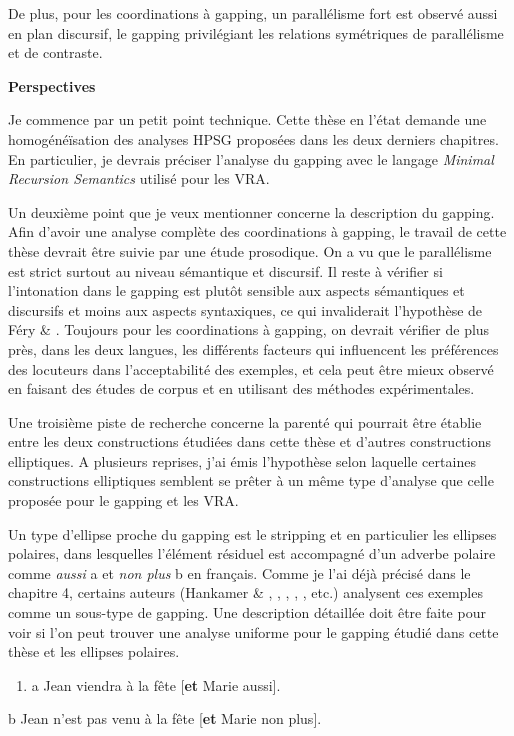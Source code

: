 De plus, pour les coordinations à gapping, un parallélisme fort est observé aussi en plan discursif, le gapping privilégiant les relations symétriques de parallélisme et de contraste.

{\bfseries
Perspectives}

Je commence par un petit point technique. Cette thèse en l'état demande une homogénéïsation des analyses HPSG proposées dans les deux derniers chapitres. En particulier, je devrais préciser l'analyse du gapping avec le langage \textit{Minimal Recursion Semantics} utilisé pour les VRA.

Un deuxième point que je veux mentionner concerne la description du gapping. Afin d'avoir une analyse complète des coordinations à gapping, le travail de cette thèse devrait être suivie par une étude prosodique. On a vu que le parallélisme est strict surtout au niveau sémantique et discursif. Il reste à vérifier si l'intonation dans le gapping est plutôt sensible aux aspects sémantiques et discursifs et moins aux aspects syntaxiques, ce qui invaliderait l'hypothèse de Féry \& \citet{Hartmann2005}. Toujours pour les coordinations à gapping, on devrait vérifier de plus près, dans les deux langues, les différents facteurs qui influencent les préférences des locuteurs dans l'acceptabilité des exemples, et cela peut être mieux observé en faisant des études de corpus et en utilisant des méthodes expérimentales.

Une troisième piste de recherche concerne la parenté qui pourrait être établie entre les deux constructions étudiées dans cette thèse et d'autres constructions elliptiques. A plusieurs reprises, j'ai émis l'hypothèse selon laquelle certaines constructions elliptiques semblent se prêter à un même type d'analyse que celle proposée pour le gapping et les VRA. 

Un type d'ellipse proche du gapping est le stripping et en particulier les ellipses polaires, dans lesquelles l'élément résiduel est accompagné d'un adverbe polaire comme \textit{aussi} a et \textit{non plus} b en français. Comme je l'ai déjà précisé dans le chapitre 4, certains auteurs (Hankamer \& \citet{Sag1976}, \citet{Gardent1991}, \citet{Lobeck1995}, \citet{Hartmann2000}, \citet{Toosarvandani2011}, etc.) analysent ces exemples comme un sous-type de gapping. Une description détaillée doit être faite pour voir si l'on peut trouver une analyse uniforme pour le gapping étudié dans cette thèse et les ellipses polaires.


\begin{enumerate}
\item \label{bkm:Ref307424453}a  Jean viendra à la fête [\textbf{et} Marie aussi]. 


\end{enumerate}
  b  Jean n'est pas venu à la fête [\textbf{et} Marie non plus].

